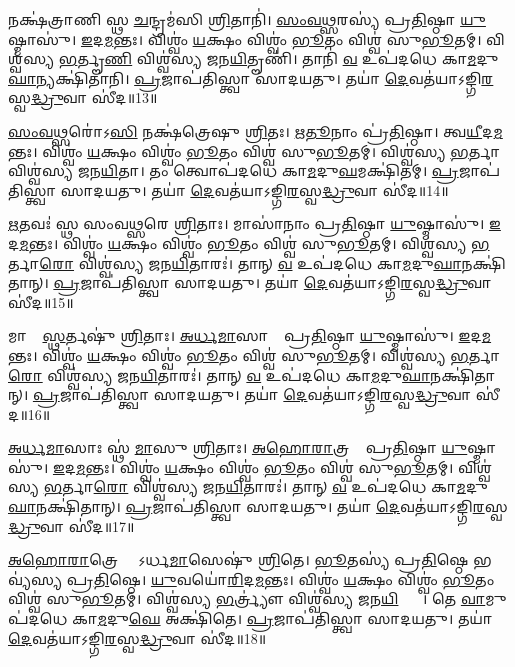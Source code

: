    𑌨𑌕𑍍𑌷॑𑌤𑍍𑌰𑌾𑌣𑌿 𑌸𑍍𑌥 \ul{𑌚}𑌨𑍍𑌦𑍍𑌰𑌮॑𑌸𑌿 \ul{𑌶𑍍𑌰𑌿}𑌤𑌾𑌨𑌿॑।
   \ul{𑌸𑌂}\ul{𑌵}\ul{𑌥𑍍𑌸}𑌰𑌸𑍍𑌯॑ 𑌪𑍍𑌰\ul{𑌤𑌿}𑌷𑍍𑌠𑌾 \ul{𑌯𑍁}𑌷𑍍𑌮𑌾𑌸𑍁॑। 
   \ul{𑌇}𑌦\ul{𑌮}𑌨𑍍𑌤𑌃।
   𑌵𑌿𑌶𑍍𑌵𑌂॑ \ul{𑌯}𑌕𑍍𑌷𑌂 𑌵𑌿𑌶𑍍𑌵𑌂॑ \ul{𑌭𑍂}𑌤𑌂 𑌵𑌿𑌶𑍍𑌵॑ 𑌸𑍁\ul{𑌭𑍂}𑌤𑌮𑍍।
   𑌵𑌿𑌶𑍍𑌵॑𑌸𑍍𑌯 \ul{𑌭}𑌰𑍍𑌤𑍄\ul{𑌣𑌿} 𑌵𑌿𑌶𑍍𑌵॑𑌸𑍍𑌯 𑌜𑌨\ul{𑌯𑌿}𑌤𑍄𑌣𑌿॑।
   𑌤𑌾𑌨𑌿॑ \ul{𑌵} 𑌉𑌪॑𑌦𑌧𑍇 𑌕𑌾\ul{𑌮}𑌦𑍁\ul{𑌘𑌾}𑌨𑍍𑌯𑌕𑍍𑌷𑌿॑𑌤𑌾𑌨𑌿।
   \ul{𑌪𑍍𑌰}𑌜𑌾𑌪॑𑌤𑌿𑌸𑍍𑌤𑍍𑌵𑌾 𑌸𑌾𑌦𑌯𑌤𑍁।
   𑌤𑌯𑌾॑ \ul{𑌦𑍇}𑌵𑌤॑𑌯𑌾𑌽𑌙𑍍𑌗𑌿\ul{𑌰}𑌸𑍍𑌵\ul{𑌦𑍍𑌧𑍍𑌰𑍁}𑌵𑌾 𑌸𑍀॑𑌦॥13॥

   \ul{𑌸𑌂}\ul{𑌵}\ul{𑌥𑍍𑌸}𑌰𑍋॑𑌽\ul{𑌸𑌿} 𑌨𑌕𑍍𑌷॑𑌤𑍍𑌰𑍇𑌷𑍁 \ul{𑌶𑍍𑌰𑌿}𑌤𑌃।
   \ul{𑌋}\ul{𑌤𑍂}𑌨𑌾𑌂 𑌪𑍍𑌰॑\ul{𑌤𑌿}𑌷𑍍𑌠𑌾। 
   𑌤𑍍𑌵\ul{𑌯𑍀}𑌦\ul{𑌮}𑌨𑍍𑌤𑌃।
   𑌵𑌿𑌶𑍍𑌵𑌂॑ \ul{𑌯}𑌕𑍍𑌷𑌂 𑌵𑌿𑌶𑍍𑌵𑌂॑ \ul{𑌭𑍂}𑌤𑌂 𑌵𑌿𑌶𑍍𑌵॑ 𑌸𑍁\ul{𑌭𑍂}𑌤𑌮𑍍।
   𑌵𑌿𑌶𑍍𑌵॑𑌸𑍍𑌯 \ul{𑌭}𑌰𑍍𑌤𑌾 𑌵𑌿𑌶𑍍𑌵॑𑌸𑍍𑌯 𑌜𑌨\ul{𑌯𑌿}𑌤𑌾।
   𑌤𑌂 𑌤𑍍𑌵𑍋𑌪॑𑌦𑌧𑍇 𑌕𑌾\ul{𑌮}𑌦𑍁\ul{𑌘}𑌮𑌕𑍍𑌷𑌿॑𑌤𑌮𑍍।
   \ul{𑌪𑍍𑌰}𑌜𑌾𑌪॑𑌤𑌿𑌸𑍍𑌤𑍍𑌵𑌾 𑌸𑌾𑌦𑌯𑌤𑍁।
   𑌤𑌯𑌾॑ \ul{𑌦𑍇}𑌵𑌤॑𑌯𑌾𑌽𑌙𑍍𑌗𑌿\ul{𑌰}𑌸𑍍𑌵\ul{𑌦𑍍𑌧𑍍𑌰𑍁}𑌵𑌾 𑌸𑍀॑𑌦॥14॥

   \ul{𑌋}𑌤𑌵𑌃॑ 𑌸𑍍𑌥 𑌸𑌂𑌵\ul{𑌥𑍍𑌸}𑌰𑍇 \ul{𑌶𑍍𑌰𑌿}𑌤𑌾𑌃।
   𑌮𑌾𑌸𑌾॑𑌨𑌾𑌂 𑌪𑍍𑌰\ul{𑌤𑌿}𑌷𑍍𑌠𑌾 \ul{𑌯𑍁}𑌷𑍍𑌮𑌾𑌸𑍁॑। 
   \ul{𑌇}𑌦\ul{𑌮}𑌨𑍍𑌤𑌃।
   𑌵𑌿𑌶𑍍𑌵𑌂॑ \ul{𑌯}𑌕𑍍𑌷𑌂 𑌵𑌿𑌶𑍍𑌵𑌂॑ \ul{𑌭𑍂}𑌤𑌂 𑌵𑌿𑌶𑍍𑌵॑ 𑌸𑍁\ul{𑌭𑍂}𑌤𑌮𑍍।
   𑌵𑌿𑌶𑍍𑌵॑𑌸𑍍𑌯 \ul{𑌭}𑌰𑍍𑌤𑌾\ul{𑌰𑍋} 𑌵𑌿𑌶𑍍𑌵॑𑌸𑍍𑌯 𑌜𑌨\ul{𑌯𑌿}𑌤𑌾𑌰𑌃॑।
   𑌤𑌾𑌨𑍍 \ul{𑌵} 𑌉𑌪॑𑌦𑌧𑍇 𑌕𑌾\ul{𑌮}𑌦𑍁\ul{𑌘𑌾}𑌨𑌕𑍍𑌷𑌿॑𑌤𑌾𑌨𑍍।
   \ul{𑌪𑍍𑌰}𑌜𑌾𑌪॑𑌤𑌿𑌸𑍍𑌤𑍍𑌵𑌾 𑌸𑌾𑌦𑌯𑌤𑍁।
   𑌤𑌯𑌾॑ \ul{𑌦𑍇}𑌵𑌤॑𑌯𑌾𑌽𑌙𑍍𑌗𑌿\ul{𑌰}𑌸𑍍𑌵\ul{𑌦𑍍𑌧𑍍𑌰𑍁}𑌵𑌾 𑌸𑍀॑𑌦॥15॥

   𑌮𑌾𑌸𑌾𑌃᳚ \ul{𑌸𑍍𑌥}𑌰𑍍𑌤𑌷𑍁॑ \ul{𑌶𑍍𑌰𑌿}𑌤𑌾𑌃।
   \ul{𑌅}\ul{𑌰𑍍𑌧}\ul{𑌮𑌾}𑌸𑌾𑌨𑌾𑌂᳚ 𑌪𑍍𑌰\ul{𑌤𑌿}𑌷𑍍𑌠𑌾 \ul{𑌯𑍁}𑌷𑍍𑌮𑌾𑌸𑍁॑। 
   \ul{𑌇}𑌦\ul{𑌮}𑌨𑍍𑌤𑌃।
   𑌵𑌿𑌶𑍍𑌵𑌂॑ \ul{𑌯}𑌕𑍍𑌷𑌂 𑌵𑌿𑌶𑍍𑌵𑌂॑ \ul{𑌭𑍂}𑌤𑌂 𑌵𑌿𑌶𑍍𑌵॑ 𑌸𑍁\ul{𑌭𑍂}𑌤𑌮𑍍।
   𑌵𑌿𑌶𑍍𑌵॑𑌸𑍍𑌯 \ul{𑌭}𑌰𑍍𑌤𑌾\ul{𑌰𑍋} 𑌵𑌿𑌶𑍍𑌵॑𑌸𑍍𑌯 𑌜𑌨\ul{𑌯𑌿}𑌤𑌾𑌰𑌃॑।
   𑌤𑌾𑌨𑍍 \ul{𑌵} 𑌉𑌪॑𑌦𑌧𑍇 𑌕𑌾\ul{𑌮}𑌦𑍁\ul{𑌘𑌾}𑌨𑌕𑍍𑌷𑌿॑𑌤𑌾𑌨𑍍।
   \ul{𑌪𑍍𑌰}𑌜𑌾𑌪॑𑌤𑌿𑌸𑍍𑌤𑍍𑌵𑌾 𑌸𑌾𑌦𑌯𑌤𑍁।
   𑌤𑌯𑌾॑ \ul{𑌦𑍇}𑌵𑌤॑𑌯𑌾𑌽𑌙𑍍𑌗𑌿\ul{𑌰}𑌸𑍍𑌵\ul{𑌦𑍍𑌧𑍍𑌰𑍁}𑌵𑌾 𑌸𑍀॑𑌦॥16॥

   \ul{𑌅}\ul{𑌰𑍍𑌧}\ul{𑌮𑌾}𑌸𑌾𑌃 𑌸𑍍𑌥॑ \ul{𑌮𑌾}𑌸𑍁 \ul{𑌶𑍍𑌰𑌿}𑌤𑌾𑌃।
   \ul{𑌅}\ul{𑌹𑍋}\ul{𑌰𑌾}𑌤𑍍𑌰𑌯𑍋𑌃᳚ 𑌪𑍍𑌰\ul{𑌤𑌿}𑌷𑍍𑌠𑌾 \ul{𑌯𑍁}𑌷𑍍𑌮𑌾𑌸𑍁॑। 
   \ul{𑌇}𑌦\ul{𑌮}𑌨𑍍𑌤𑌃।
   𑌵𑌿𑌶𑍍𑌵𑌂॑ \ul{𑌯}𑌕𑍍𑌷𑌂 𑌵𑌿𑌶𑍍𑌵𑌂॑ \ul{𑌭𑍂}𑌤𑌂 𑌵𑌿𑌶𑍍𑌵॑ 𑌸𑍁\ul{𑌭𑍂}𑌤𑌮𑍍।
   𑌵𑌿𑌶𑍍𑌵॑𑌸𑍍𑌯 \ul{𑌭}𑌰𑍍𑌤𑌾\ul{𑌰𑍋} 𑌵𑌿𑌶𑍍𑌵॑𑌸𑍍𑌯 𑌜𑌨\ul{𑌯𑌿}𑌤𑌾𑌰𑌃॑।
   𑌤𑌾𑌨𑍍 \ul{𑌵} 𑌉𑌪॑𑌦𑌧𑍇 𑌕𑌾\ul{𑌮}𑌦𑍁\ul{𑌘𑌾}𑌨𑌕𑍍𑌷𑌿॑𑌤𑌾𑌨𑍍।
   \ul{𑌪𑍍𑌰}𑌜𑌾𑌪॑𑌤𑌿𑌸𑍍𑌤𑍍𑌵𑌾 𑌸𑌾𑌦𑌯𑌤𑍁।
   𑌤𑌯𑌾॑ \ul{𑌦𑍇}𑌵𑌤॑𑌯𑌾𑌽𑌙𑍍𑌗𑌿\ul{𑌰}𑌸𑍍𑌵\ul{𑌦𑍍𑌧𑍍𑌰𑍁}𑌵𑌾 𑌸𑍀॑𑌦॥17॥

   \ul{𑌅}\ul{𑌹𑍋}\ul{𑌰𑌾}𑌤𑍍𑌰𑍇 𑌸𑍍𑌥𑍋᳚𑌽𑌰𑍍𑌧\ul{𑌮𑌾}𑌸𑍇𑌷𑍁॑ \ul{𑌶𑍍𑌰𑌿}𑌤𑍇।
   \ul{𑌭𑍂}𑌤𑌸𑍍𑌯॑ 𑌪𑍍𑌰\ul{𑌤𑌿}𑌷𑍍𑌠𑍇 𑌭𑌵𑍍𑌯॑𑌸𑍍𑌯 𑌪𑍍𑌰\ul{𑌤𑌿}𑌷𑍍𑌠𑍇।
   \ul{𑌯𑍁}𑌵𑌯𑍋॑\ul{𑌰𑌿}𑌦\ul{𑌮}𑌨𑍍𑌤𑌃।
   𑌵𑌿𑌶𑍍𑌵𑌂॑ \ul{𑌯}𑌕𑍍𑌷𑌂 𑌵𑌿𑌶𑍍𑌵𑌂॑ \ul{𑌭𑍂}𑌤𑌂 𑌵𑌿𑌶𑍍𑌵॑ 𑌸𑍁\ul{𑌭𑍂}𑌤𑌮𑍍।
   𑌵𑌿𑌶𑍍𑌵॑𑌸𑍍𑌯 \ul{𑌭}𑌰𑍍𑌤𑍍𑌰𑍍𑌯𑍗॑ 𑌵𑌿𑌶𑍍𑌵॑𑌸𑍍𑌯 𑌜𑌨\ul{𑌯𑌿}𑌤𑍍𑌰𑍍𑌯𑍗᳚।
   𑌤𑍇 \ul{𑌵𑌾}𑌮𑍁𑌪॑𑌦𑌧𑍇 𑌕𑌾\ul{𑌮}𑌦𑍁\ul{𑌘𑍇} 𑌅𑌕𑍍𑌷𑌿॑𑌤𑍇।
   \ul{𑌪𑍍𑌰}𑌜𑌾𑌪॑𑌤𑌿𑌸𑍍𑌤𑍍𑌵𑌾 𑌸𑌾𑌦𑌯𑌤𑍁।
   𑌤𑌯𑌾॑ \ul{𑌦𑍇}𑌵𑌤॑𑌯𑌾𑌽𑌙𑍍𑌗𑌿\ul{𑌰}𑌸𑍍𑌵\ul{𑌦𑍍𑌧𑍍𑌰𑍁}𑌵𑌾 𑌸𑍀॑𑌦॥18॥

